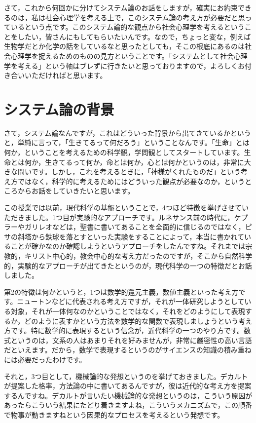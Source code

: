 \documentclass{ltjsbook}
\begin{document}
さて，これから何回かに分けてシステム論のお話をしますが，確実にお約束できるのは，私は社会心理学を考える上で，このシステム論の考え方が必要だと思っているという点です。このシステム論的な観点から社会心理学を考えるということをしたい，皆さんにもしてもらいたいんです。なので，ちょっと変な，例えば生物学だとか化学の話をしているなと思ったとしても，そこの根底にあるのは社会心理学を捉えるためのものの見方ということです。「システムとして社会心理学を考える」という軸はブレずに行きたいと思っておりますので，よろしくお付き合いいただければと思います。

\section{システム論の背景}
さて，システム論なんですが，これはどういった背景から出てきているかというと，単純に言って，「生きてるって何だろう」ということなんです。「生命」とは何か，ということを考えるための科学観，学問観としてスタートしています。生命とは何か，生きてるって何か，命とは何か，心とは何かというのは，非常に大きな問いです。しかし，これを考えるときに，「神様がくれたものだ」という考え方ではなく，科学的に考えるためにはどういった観点が必要なのか，というところからお話をしていきたいと思います。

この授業では以前，現代科学の基盤ということで，4つほど特徴を挙げさせていただきました。1つ目が実験的なアプローチです。ルネサンス前の時代に，ケプラーやガリレオなどは，聖書に書いてあることを全面的に信じるのではなく，ピサの斜塔から鉄球を落とすといった実験をすることによって，本当に書かれていることが確かなのか確認しようというアプローチをしたんですね。それまでは宗教的，キリスト中心的，教会中心的な考え方だったのですが，そこから自然科学的，実験的なアプローチが出てきたというのが，現代科学の一つの特徴だとお話しました。

第2の特徴は何かというと，1つは数学的還元主義，数値主義といった考え方です。ニュートンなどに代表される考え方ですが，それが一体研究しようとしている対象，それが一体何なのかということではなく，それをどのようにして表現するか，どのように表すかという方法を数学的な関数で表現しましょうという考え方です。特に数学的に表現するという信念が，近代科学の一つのやり方です。数式というのは，文系の人はあまりそれを好みませんが，非常に厳密性の高い言語だといえます。だから，数学で表現するというのがサイエンスの知識の積み重ねには必要だったわけです。

それと，3つ目として，機械論的な発想というのを挙げておきました。デカルトが提案した格率，方法論の中に書いてあるんですが，彼は近代的な考え方を提案するんですね。デカルトが言いたい機械論的な発想というのは，こういう原因があったらこういう結果にたどり着きますよね，こういうメカニズムで，この順番で物事が動きますねという因果的なプロセスを考えるという発想です。
\end{document}
